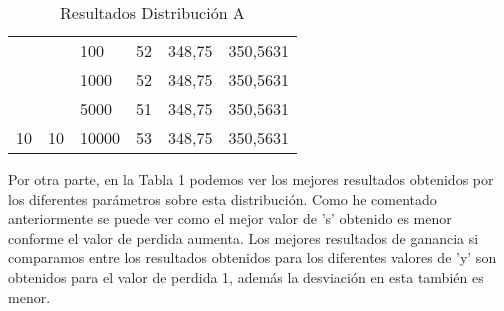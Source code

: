 \documentclass{article}
\begin{document}
\begin{table}[h]
\begin{tabular}{llllll}
			\multicolumn{1}{|l|}{}                                                 & \multicolumn{1}{l|}{}                                                 & \multicolumn{1}{l|}{100}                                                  & \multicolumn{1}{l|}{52}                                                      & \multicolumn{1}{l|}{348,75}                                                         & \multicolumn{1}{l|}{350,5631}                                                         \\ \cline{3-6} 
			\multicolumn{1}{|l|}{}                                                 & \multicolumn{1}{l|}{}                                                 & \multicolumn{1}{l|}{1000}                                                 & \multicolumn{1}{l|}{52}                                                      & \multicolumn{1}{l|}{348,75}                                                         & \multicolumn{1}{l|}{350,5631}                                                         \\ \cline{3-6} 
			\multicolumn{1}{|l|}{}                                                 & \multicolumn{1}{l|}{}                                                 & \multicolumn{1}{l|}{5000}                                                 & \multicolumn{1}{l|}{51}                                                      & \multicolumn{1}{l|}{348,75}                                                         & \multicolumn{1}{l|}{350,5631}                                                         \\ \cline{3-6} 
			\multicolumn{1}{|l|}{\multirow{-4}{*}{10}}                             & \multicolumn{1}{l|}{\multirow{-4}{*}{10}}                             & \multicolumn{1}{l|}{10000}                                                & \multicolumn{1}{l|}{53}                                                      & \multicolumn{1}{l|}{348,75}                                                         & \multicolumn{1}{l|}{350,5631}                                                         \\ \hline
		\end{tabular}
	\caption{Resultados Distribución A}
	\end{table}

	Por otra parte, en la Tabla 1 podemos ver los mejores resultados obtenidos por los diferentes parámetros sobre esta distribución. Como he comentado anteriormente se puede ver como el mejor valor de 's' obtenido es menor conforme el valor de perdida aumenta. Los mejores resultados de ganancia si comparamos entre los resultados obtenidos para los diferentes valores de 'y' son obtenidos para el valor de perdida 1, además la desviación en esta también es menor.
\end{document}
